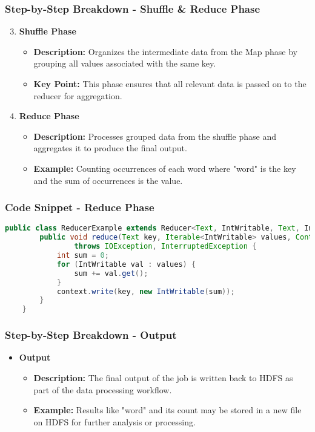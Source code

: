 \documentclass[aspectratio=169]{beamer}
\begin{document}
\begin{frame}
    \frametitle{Step-by-Step Breakdown - Shuffle & Reduce Phase}
    \begin{enumerate}
        \setcounter{enumi}{2} %
        \item \textbf{Shuffle Phase}
        \begin{itemize}
            \item \textbf{Description:} Organizes the intermediate data from the Map phase by grouping all values associated with the same key.
            \item \textbf{Key Point:} This phase ensures that all relevant data is passed on to the reducer for aggregation.
        \end{itemize}

        \item \textbf{Reduce Phase}
        \begin{itemize}
            \item \textbf{Description:} Processes grouped data from the shuffle phase and aggregates it to produce the final output.
            \item \textbf{Example:} Counting occurrences of each word where "word" is the key and the sum of occurrences is the value.
        \end{itemize}
    \end{enumerate}
\end{frame}

\begin{frame}[fragile]
    \frametitle{Code Snippet - Reduce Phase}
    \begin{lstlisting}[language=Java]
    public class ReducerExample extends Reducer<Text, IntWritable, Text, IntWritable> {
        public void reduce(Text key, Iterable<IntWritable> values, Context context)
                throws IOException, InterruptedException {
            int sum = 0;
            for (IntWritable val : values) {
                sum += val.get();
            }
            context.write(key, new IntWritable(sum));
        }
    }
    \end{lstlisting}
\end{frame}

\begin{frame}
    \frametitle{Step-by-Step Breakdown - Output}
    \begin{itemize}
        \item \textbf{Output}
        \begin{itemize}
            \item \textbf{Description:} The final output of the job is written back to HDFS as part of the data processing workflow.
            \item \textbf{Example:} Results like "word" and its count may be stored in a new file on HDFS for further analysis or processing.
        \end{itemize}
    \end{itemize}
\end{frame}
\end{document}
